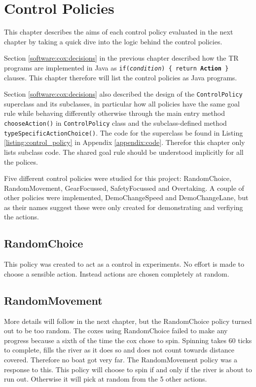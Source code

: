 \chapter{Control Policies}\label{chapter:control_policy}

This chapter describes the aims of each control policy evaluated in the next chapter by taking a quick dive into the logic behind the control policies. 

Section \ref{software:cox:decisions} in the previous chapter described how the TR programs are implemented in Java as \texttt{if(\emph{condition}) \{ return \textbf{Action} \}} clauses. This chapter therefore will list the control policies as Java programs. 

Section \ref{software:cox:decisions} also described the design of the \texttt{ControlPolicy} superclass and its subclasses, in particular how all policies have the same goal rule while behaving differently otherwise through the main entry method \texttt{chooseAction()} in \texttt{ControlPolicy} class and the subclass-defined method \texttt{typeSpecificActionChoice()}. The code for the superclass be found in Listing \ref{listing:control_policy} in Appendix \ref{appendix:code}. Therefor this chapter only lists subclass code. The shared goal rule should be understood implicitly for all the polices.

Five different control policies were studied for this project: RandomChoice, RandomMovement, GearFocussed, SafetyFocussed and Overtaking. A couple of other policies were implemented, DemoChangeSpeed and DemoChangeLane, but as their names suggest these were only created for demonstrating and verfiying the actions.

\section{RandomChoice}
This policy was created to act as a control in experiments. No effort is made to choose a sensible action. Instead actions are chosen completely at random.

\section{RandomMovement}

More details will follow in the next chapter, but the RandomChoice policy turned out to be too random. The coxes using RandomChoice failed to make any progress because a sixth of the time the cox chose to spin. Spinning takes 60 ticks to complete, fills the river as it does so and does not count towards distance covered. Therefore no boat got very far. The RandomMovement policy was a response to this. This policy will choose to spin if and only if the river is about to run out. Otherwise it will pick at random from the 5 other actions.

